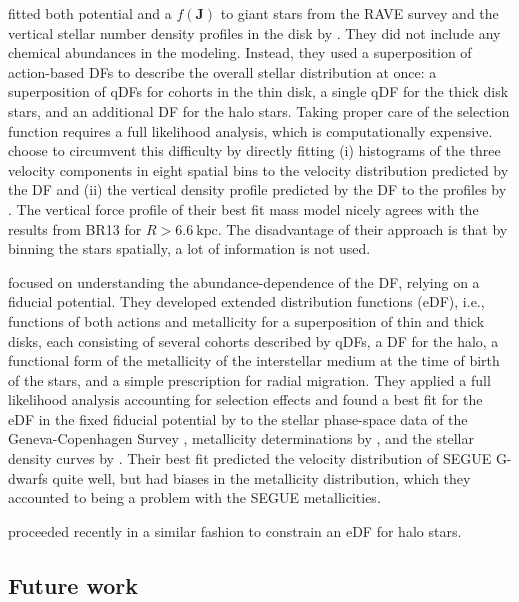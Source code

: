 \documentclass[iop,revtex4,numberedappendix,appendixfloats]{emulateapj}
\newcommand{\vect}[1]{\boldsymbol{#1}}
\begin{document}
\citet{2014MNRAS.445.3133P} fitted both potential and a $f(\vect{J})$ to giant stars from the RAVE survey \citep{2006AJ....132.1645S} and the vertical stellar number density profiles in the disk by \citet{2008ApJ...673..864J}. They did not include any chemical abundances in the modeling. Instead, they used a superposition of action-based DFs to describe the overall stellar distribution at once: a superposition of qDFs for cohorts in the thin disk, a single qDF for the thick disk stars, and an additional DF for the halo stars. Taking proper care of the selection function requires a full likelihood analysis, which is computationally expensive. \citet{2014MNRAS.445.3133P} choose to circumvent this difficulty by directly fitting (i) histograms of the three velocity components in eight spatial bins to the velocity distribution predicted by the DF and (ii) the vertical density profile predicted by the DF to the profiles by \citet{2008ApJ...673..864J}. The vertical force profile of their best fit mass model nicely agrees with the results from BR13 for $R>6.6~\text{kpc}$. The disadvantage of their approach is that by binning the stars spatially, a lot of information is not used.

\citet{2015MNRAS.449.3479S} focused on understanding the abundance-dependence of the DF, relying on a fiducial potential. They developed extended distribution functions (eDF), i.e., functions of both actions and metallicity for a superposition of thin and thick disks, each consisting of several cohorts described by qDFs, a DF for the halo, a functional form of the metallicity of the interstellar medium at the time of birth of the stars, and a simple prescription for radial migration. They applied a full likelihood analysis accounting for selection effects and found a best fit for the eDF in the fixed fiducial potential by \citet{1998MNRAS.294..429D} to the stellar phase-space data of the Geneva-Copenhagen Survey \citep{2004A&A...418..989N,2009A&A...501..941H}, metallicity determinations by \citet{2011A&A...530A.138C}, and the stellar density curves by \citet{1983MNRAS.202.1025G}. Their best fit predicted the velocity distribution of SEGUE G-dwarfs \citep{2014ApJS..211...17A} quite well, but had biases in the metallicity distribution, which they accounted to being a problem with the SEGUE metallicities. 

\citet{2016MNRAS.tmp..817D} proceeded recently in a similar fashion to constrain an eDF for halo stars.\\

\subsection{Future work} 
\end{document}
